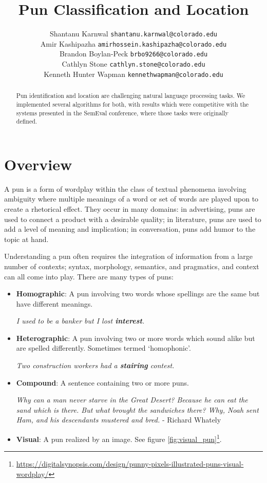\documentclass{article}
\title{Pun Classification and Location}
\author{
   Shantanu Karnwal \texttt{shantanu.karnwal@colorado.edu} \\
   \And Amir Kashipazha \texttt{amirhossein.kashipazha@colorado.edu} \\
   \And Brandon Boylan-Peck \texttt{brbo9266@colorado.edu} \\
   \And Cathlyn Stone \texttt{cathlyn.stone@colorado.edu} \\
   \And Kenneth Hunter Wapman \texttt{kennethwapman@colorado.edu} \\
}
\begin{document}
\maketitle

\begin{abstract}
	Pun identification and location are challenging natural language processing 
	tasks. We implemented several algorithms for both, with results which 
	were competitive with the systems presented in the SemEval conference, where
	those tasks were originally defined.
\end{abstract}


\section{Overview}
A pun is a form of wordplay within the class of textual phenomena involving
ambiguity where multiple meanings of a word or set of words are played upon to
create a rhetorical effect. They occur in many domains: in advertising, puns
are used to connect a product with a desirable quality; in literature, puns are
used to add a level of meaning and implication; in conversation, puns add humor
to the topic at hand.

Understanding a pun often requires the integration of information from a large
number of contexts; syntax, morphology, semantics, and pragmatics, and context
can all come into play. There are many types of puns:

\begin{itemize}
	\item{\textbf{Homographic}: A pun involving two words whose spellings are
		the same but have different meanings.
		\begin{center}
		\emph{I used to be a banker but I lost \textbf{interest}.}
		\end{center}
	}
	\item{\textbf{Heterographic}: A pun involving two or more words which sound
		alike but are spelled differently. Sometimes termed `homophonic'.
		\begin{center}
		\emph{Two construction workers had a \textbf{stairing} contest.}
		\end{center}
	}
	\item{\textbf{Compound}: A sentence containing two or more puns.
		\begin{center}
		\emph{Why can a man never starve in the Great Desert? Because he can
		eat the sand which is there. But what brought the sandwiches there?
		Why, Noah sent Ham, and his descendants mustered and bred.} - Richard Whately
		\end{center}
	}
	\item{\textbf{Visual}: A pun realized by an image. See figure \ref{fig:visual_pun}\footnote{\url{https://digitalsynopsis.com/design/punny-pixels-illustrated-puns-visual-wordplay/}}.
	}
\end{itemize}
\end{document}
